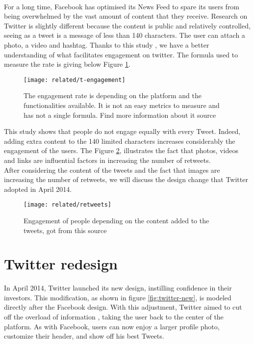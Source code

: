 \paragraph{}
For a long time, Facebook has optimised its News Feed to spare its users from being overwhelmed by the vast amount of content that they receive. Research on Twitter is slightly different because the content is public and relatively controlled, seeing as a tweet is a message of less than 140 characters. The user can attach a photo, a video and hashtag. Thanks to this study \cite{t_fuel}, we have a better understanding of what facilitates engagement on twitter. The formula used to measure the rate is giving below Figure \ref{fig:t-engagement}.

\begin{figure}[h] 
\centering 
\texttt{[image: related/t-engagement]} 
\caption[Twitter engagement rate]{The engagement rate is depending on the platform and the functionalities available. It is not an easy metrics to measure and has not a single formula. Find more information about it source \cite{f_t_engag_rates}}
\label{fig:t-engagement}
\end{figure}

This study shows that people do not engage equally with every Tweet. Indeed, adding extra content to the 140 limited characters increases considerably the engagement of the users. The Figure \ref{fig:t-retweets}, illustrates the fact that photos, videos and links are influential factors in increasing the number of retweets. \\
After considering the content of the tweets and the fact that images are increasing the number of retweets, we will discuss the design change that Twitter adopted in April 2014.

\begin{figure}[h] 
\centering 
\texttt{[image: related/retweets]} 
\caption[Level of retweet]{Engagement of people depending on the content added to the tweets, got from this source \cite{t_fuel}}
\label{fig:t-retweets}
\end{figure}


\section{Twitter redesign}
\paragraph{}
In April 2014, Twitter launched its new design, instilling confidence in their investors. This modification, as shown in figure \ref{fig:twitter-new}, is modeled directly after the Facebook design.
With this adjustment, Twitter aimed to cut off the overload of information \cite{t_new_timeline}, taking the user back to the center of the platform. As with Facebook, users can now enjoy a larger profile photo, customize their header, and show off his best Tweets. 

